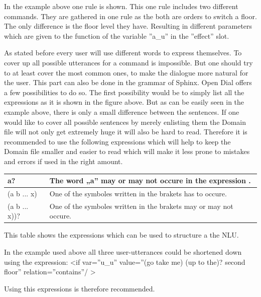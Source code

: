 \documentclass[a4paper, 12pt]{article}
\begin{document}
In the example above one rule is shown.
This one rule includes two different commands.
They are gathered in one rule as the both are orders to switch a floor.
The only difference is the floor level they have.
Resulting in different parameters which are given to the function of the variable ”a\_u” in the ”effect” slot. \newline



As stated before every user will use different words to express themselves.
To cover up all possible utterances for a command is impossible.
But one should try to at least cover the most common ones,  to make the dialogue more natural for the user.
This part can also be done in the grammar of Sphinx.
Open Dial offers a few possibilities to do so.
The first possibility would be to simply list all the expressions as it is shown in the figure above.
But as can be easily seen in the example above, there is only a small difference between the sentences.
If one would like to cover all possible sentences by merely enlisting them the Domain file will not only get extremely huge it will also be hard to read.
Therefore it is recommended to use the following expressions which will help to keep the Domain file smaller and easier to read which will make it less prone to mistakes and errors if used in the right amount. \newline


\begin{tabular}{|ll|}
\hline
	a? & The word „a” may or may not occure in the expression .  \\
\hline
	(a \textbar b \textbar... \textbar x) & One of the symboles written	in the brakets has to occure.\\
\hline
	(a \textbar b \textbar... \textbar x))? & One of the symboles written in the brakets may or may not occure.  \\
\hline
\end{tabular}
\newline

This table shows the expressions which can be used to structure a the NLU. \newline \newline

In the example used above all three user-utterances could be shortened down using the expression:
\textless if var=”u\_u” value=”(go \textbar take me) (up to the)?  second floor” relation=”contains”/ \textgreater

Using this expressions is therefore recommended.
\end{document}
